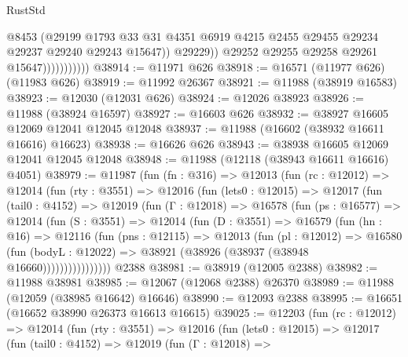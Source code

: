 \begin{lexlean}{RustStd}
\begin{coremodule}
                                @8453
                                (@29199
                                  @1793
                                  @33
                                  @31
                                  @4351
                                  @6919
                                  @4215
                                  @2455
                                  @29455
                                  @29234
                                  @29237
                                  @29240
                                  @29243
                                  @15647))
                              @29229))
                          @29252
                          @29255
                          @29258
                          @29261
                          @15647)))))))))))
@38914 := @11971 @626
@38918 := @16571 (@11977 @626) (@11983 @626)
@38919 := @11992 @26367
@38921 := @11988 (@38919 @16583)
@38923 := @12030 (@12031 @626)
@38924 := @12026 @38923
@38926 := @11988 (@38924 @16597)
@38927 := @16603 @626
@38932 := @38927 @16605 @12069 @12041 @12045 @12048
@38937 := @11988 (@16602 (@38932 @16611 @16616) @16623)
@38938 := @16626 @626
@38943 := @38938 @16605 @12069 @12041 @12045 @12048
@38948 := @11988 (@12118 (@38943 @16611 @16616) @4051)
@38979 := @11987
    (fun (fn : @316) =>
    @12013
      (fun (rc : @12012) =>
      @12014
        (fun (rty : @3551) =>
        @12016
          (fun (lets0 : @12015) =>
          @12017
            (fun (tail0 : @4152) =>
            @12019
              (fun (Γ : @12018) =>
              @16578
                (fun (ps : @16577) =>
                @12014
                  (fun (S : @3551) =>
                  @12014
                    (fun (D : @3551) =>
                    @16579
                      (fun (hn : @16) =>
                      @12116
                        (fun (pns : @12115) =>
                        @12013
                          (fun (pl : @12012) =>
                          @16580
                            (fun (bodyL : @12022) =>
                            @38921 (@38926 (@38937 (@38948 @16660))))))))))))))))
    @2388
@38981 := @38919 (@12005 @2388)
@38982 := @11988 @38981
@38985 := @12067 (@12068 @2388) @26370
@38989 := @11988 (@12059 (@38985 @16642) @16646)
@38990 := @12093 @2388
@38995 := @16651 (@16652 @38990 @26373 @16613 @16615)
@39025 := @12203
    (fun (rc : @12012) =>
    @12014
      (fun (rty : @3551) =>
      @12016
        (fun (lets0 : @12015) =>
        @12017
          (fun (tail0 : @4152) =>
          @12019
            (fun (Γ : @12018) =>

\end{coremodule}
\end{lexlean}
